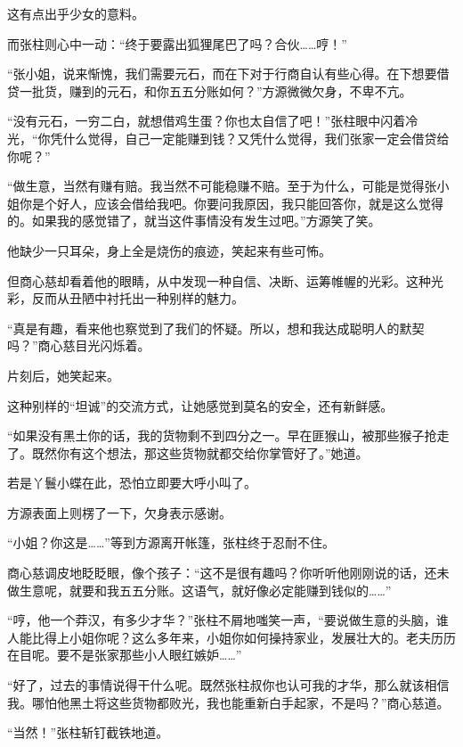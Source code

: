 \begin{this_body}
这有点出乎少女的意料。

而张柱则心中一动：“终于要露出狐狸尾巴了吗？合伙……哼！”

“张小姐，说来惭愧，我们需要元石，而在下对于行商自认有些心得。在下想要借贷一批货，赚到的元石，和你五五分账如何？”方源微微欠身，不卑不亢。

“没有元石，一穷二白，就想借鸡生蛋？你也太自信了吧！”张柱眼中闪着冷光，“你凭什么觉得，自己一定能赚到钱？又凭什么觉得，我们张家一定会借贷给你呢？”

“做生意，当然有赚有赔。我当然不可能稳赚不赔。至于为什么，可能是觉得张小姐你是个好人，应该会借给我吧。你要问我原因，我只能回答你，就是这么觉得的。如果我的感觉错了，就当这件事情没有发生过吧。”方源笑了笑。

他缺少一只耳朵，身上全是烧伤的痕迹，笑起来有些可怖。

但商心慈却看着他的眼睛，从中发现一种自信、决断、运筹帷幄的光彩。这种光彩，反而从丑陋中衬托出一种别样的魅力。

“真是有趣，看来他也察觉到了我们的怀疑。所以，想和我达成聪明人的默契吗？”商心慈目光闪烁着。

片刻后，她笑起来。

这种别样的“坦诚”的交流方式，让她感觉到莫名的安全，还有新鲜感。

“如果没有黑土你的话，我的货物剩不到四分之一。早在匪猴山，被那些猴子抢走了。既然你有这个想法，那这些货物就都交给你掌管好了。”她道。

若是丫鬟小蝶在此，恐怕立即要大呼小叫了。

方源表面上则楞了一下，欠身表示感谢。

“小姐？你这是……”等到方源离开帐篷，张柱终于忍耐不住。

商心慈调皮地眨眨眼，像个孩子：“这不是很有趣吗？你听听他刚刚说的话，还未做生意呢，就要和我五五分账。这语气，就好像必定能赚到钱似的……”

“哼，他一个莽汉，有多少才华？”张柱不屑地嗤笑一声，“要说做生意的头脑，谁人能比得上小姐你呢？这么多年来，小姐你如何操持家业，发展壮大的。老夫历历在目呢。要不是张家那些小人眼红嫉妒……”

“好了，过去的事情说得干什么呢。既然张柱叔你也认可我的才华，那么就该相信我。哪怕他黑土将这些货物都败光，我也能重新白手起家，不是吗？”商心慈道。

“当然！”张柱斩钉截铁地道。

\end{this_body}

